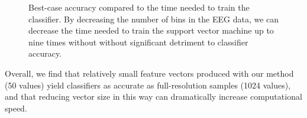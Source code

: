 \begin{figure}[!h]
  \vspace{-0.2cm}
  \centering
   {}
  \caption{ Best-case accuracy compared to the time needed to train the classifier. By decreasing the number of bins in the EEG data, we can decrease the time needed to train the support vector machine up to nine times without without significant detriment to classifier accuracy. }
  \label{fig:accuracy_vs_training}
 \end{figure}

Overall, we find that relatively small feature vectors produced with our method (50 values) yield classifiers as accurate as full-resolution samples (1024 values), and that reducing vector size in this way can dramatically increase computational speed.
